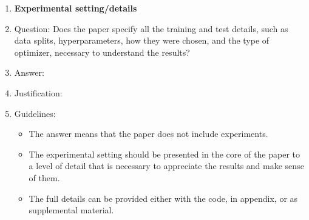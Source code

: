 \begin{enumerate}
\item {\bf Experimental setting/details}
    \item[] Question: Does the paper specify all the training and test details, such as data splits, hyperparameters, how they were chosen, and the type of optimizer, necessary to understand the results?
    \item[] Answer: \answerTODO{}
    \item[] Justification: \justificationTODO{}
    \item[] Guidelines:
    \begin{itemize}
        \item The answer \answerNA{} means that the paper does not include experiments.
        \item The experimental setting should be presented in the core of the paper to a level of detail that is necessary to appreciate the results and make sense of them.
        \item The full details can be provided either with the code, in appendix, or as supplemental material.
    \end{itemize}


\end{enumerate}

